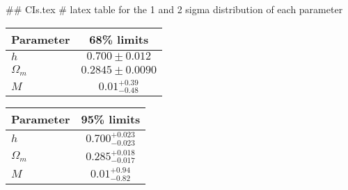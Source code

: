 ## CIs.tex
# latex table for the 1 and 2 sigma distribution of each parameter

\begin{tabular} { l  c}
 Parameter &  68\% limits\\
\hline
{\boldmath$h              $} & $0.700\pm 0.012            $\\
{\boldmath$\Omega_m       $} & $0.2845\pm 0.0090          $\\
{\boldmath$M              $} & $0.01^{+0.39}_{-0.48}      $\\
\hline
\end{tabular}

\begin{tabular} { l  c}
 Parameter &  95\% limits\\
\hline
{\boldmath$h              $} & $0.700^{+0.023}_{-0.023}   $\\
{\boldmath$\Omega_m       $} & $0.285^{+0.018}_{-0.017}   $\\
{\boldmath$M              $} & $0.01^{+0.94}_{-0.82}      $\\
\hline
\end{tabular}
